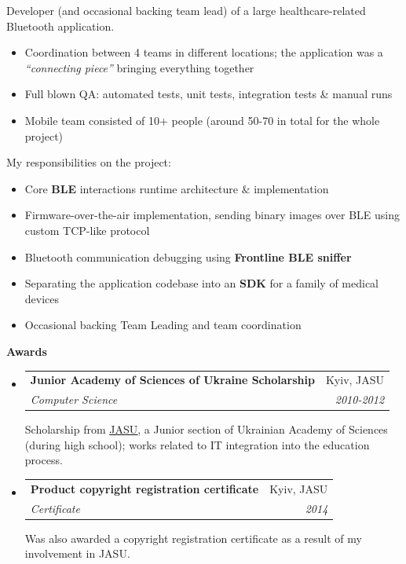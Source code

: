 \documentclass[letterpaper,11pt]{article}
\makeatletter
\newcommand{\resitem}[1]{\item #1 \vspace{-2pt}}
\newcommand{\resheading}[1]{{\vspace{.2in} \large \colorbox{title_bg}{\begin{minipage}{\textwidth}{\textbf{#1 \vphantom{p\^{E}}}}\end{minipage}}}}
\newcommand{\ressubheading}[4]{
\begin{tabular*}{7.1in}{l@{\extracolsep{\fill}}r}
		\textbf{#1} & #2 \\
		\textit{#3} & \textit{#4} \\
\end{tabular*}\vspace{-6pt}}
\makeatother
\begin{document}
\begin{itemize}
		Developer (and occasional backing team lead) of a large healthcare-related Bluetooth application.
		\begin{itemize}
				\resitem{Coordination between 4 teams in different locations; the application was a \textit{``connecting piece''} bringing everything together}
				\resitem{Full blown QA: automated tests, unit tests, integration tests \& manual runs}
				\resitem{Mobile team consisted of 10+ people (around 50-70 in total for the whole project)}
		\end{itemize}

		My responsibilities on the project:
		\begin{itemize}
				\resitem{Core \textbf{BLE} interactions runtime architecture \& implementation}
				\resitem{Firmware-over-the-air implementation, sending binary images over BLE using custom TCP-like protocol}
				\resitem{Bluetooth communication debugging using \textbf{Frontline BLE sniffer}}
				\resitem{Separating the application codebase into an \textbf{SDK} for a family of medical devices}
				\resitem{Occasional backing Team Leading and team coordination}
		\end{itemize}
\end{itemize}

\resheading{Awards}
\begin{itemize}
	\item
		\ressubheading{Junior Academy of Sciences of Ukraine Scholarship}{Kyiv, JASU}{Computer Science}{2010-2012}

		Scholarship from \href{http://man.gov.ua/en}{\textcolor{link_fg}{\underline{JASU}}}, a Junior section of Ukrainian Academy of Sciences (during high school); works related to IT integration into the education process.
	\item
		\ressubheading{Product copyright registration certificate}{Kyiv, JASU}{Certificate \textnumero40491}{2014}

		Was also awarded a copyright registration certificate as a result of my involvement in JASU.
\end{itemize}
\end{document}
